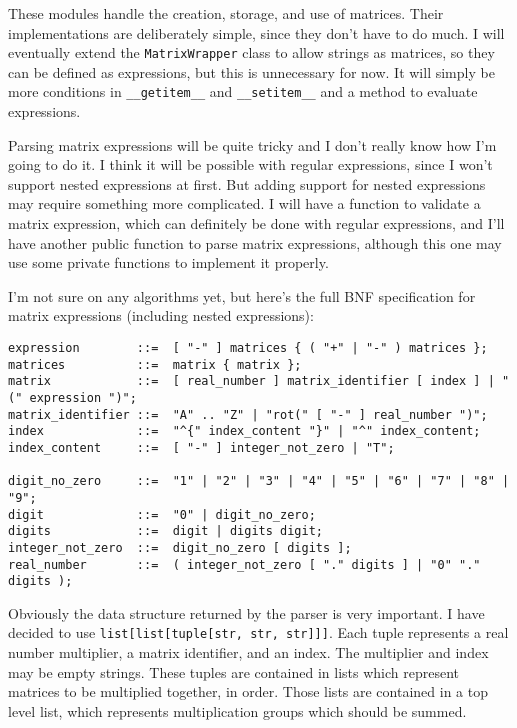 \documentclass[../main.tex]{subfiles}
\begin{document}
These modules handle the creation, storage, and use of matrices. Their implementations are deliberately simple, since they don't have to do much. I will eventually extend the \texttt{MatrixWrapper} class to allow strings as matrices, so they can be defined as expressions, but this is unnecessary for now. It will simply be more conditions in \texttt{\_\_getitem\_\_} and \texttt{\_\_setitem\_\_} and a method to evaluate expressions.

Parsing matrix expressions will be quite tricky and I don't really know how I'm going to do it. I think it will be possible with regular expressions, since I won't support nested expressions at first. But adding support for nested expressions may require something more complicated. I will have a function to validate a matrix expression, which can definitely be done with regular expressions, and I'll have another public function to parse matrix expressions, although this one may use some private functions to implement it properly.

I'm not sure on any algorithms yet, but here's the full BNF specification for matrix expressions (including nested expressions):

\begin{verbatim}
expression        ::=  [ "-" ] matrices { ( "+" | "-" ) matrices };
matrices          ::=  matrix { matrix };
matrix            ::=  [ real_number ] matrix_identifier [ index ] | "(" expression ")";
matrix_identifier ::=  "A" .. "Z" | "rot(" [ "-" ] real_number ")";
index             ::=  "^{" index_content "}" | "^" index_content;
index_content     ::=  [ "-" ] integer_not_zero | "T";

digit_no_zero     ::=  "1" | "2" | "3" | "4" | "5" | "6" | "7" | "8" | "9";
digit             ::=  "0" | digit_no_zero;
digits            ::=  digit | digits digit;
integer_not_zero  ::=  digit_no_zero [ digits ];
real_number       ::=  ( integer_not_zero [ "." digits ] | "0" "." digits );
\end{verbatim}

Obviously the data structure returned by the parser is very important. I have decided to use \texttt{list[list[tuple[str, str, str]]]}. Each tuple represents a real number multiplier, a matrix identifier, and an index. The multiplier and index may be empty strings. These tuples are contained in lists which represent matrices to be multiplied together, in order. Those lists are contained in a top level list, which represents multiplication groups which should be summed.
\end{document}
